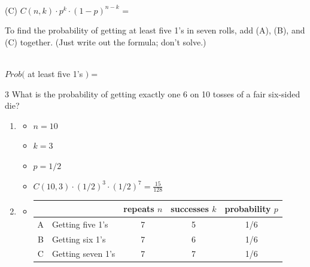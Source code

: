 {\begin{questionNOGRADE}{\thequestion}
        ~\\ (C) \tab $ C(n, k) \cdot p^{k} \cdot (1 - p)^{n-k} $ =
        ~\\ \vspace{1cm}

        To find the probability of getting at least five 1's in seven rolls,
        add (A), (B), and (C) together. (Just write out the formula; don't solve.)

        ~\\
        $Prob($ at least five 1's $) = $
    \end{questionNOGRADE}

        \notonkey{ \newpage }{ \hrulefill }
        
        \begin{question}{\thequestion}{3}
            What is the probability of getting exactly one 6 on 10 tosses
            of a fair six-sided die?            
        \end{question}


}{

    \begin{enumerate}
        \item
            \begin{itemize}
                \item   $n = 10$
                \item   $k = 3$
                \item   $p = 1/2$
                \item   $ C(10, 3) \cdot (1/2)^{3} \cdot (1/2)^{7} = \frac{15}{128}$
            \end{itemize}

        \item
            \begin{itemize}
                \item   
                    \begin{tabular}{ | c | p{4cm} | c | c | c | }
                        \hline
                        & & repeats $n$ & successes $k$ & probability $p$
                        \\ \hline
                        A & Getting five 1's & 7 & 5 & 1/6
                        \\ \hline
                        B & Getting six 1's & 7 & 6 & 1/6
                        \\ \hline
                        C & Getting seven 1's & 7 & 7 & 1/6
                        \\ \hline
                    \end{tabular}
                

\end{itemize}
\end{enumerate}}

